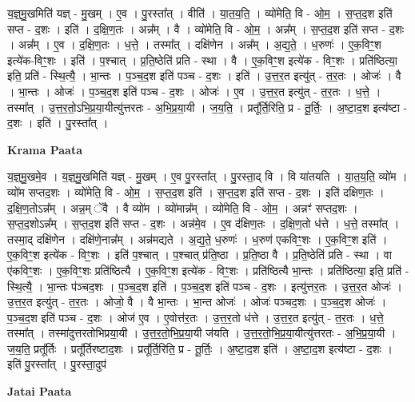 \documentclass[17pt]{extarticle}
\begin{document}
य॒ज्ञ्॒मु॒खमिति॑ यज्ञ् - मु॒खम् । ए॒व । पु॒रस्ता᳚त् । वीति॑ । या॒त॒य॒ति॒ । व्यो॑मेति॒ वि - ओ॒म॒ । स॒प्त॒द॒श इति॑ सप्त - द॒शः । इति॑ । द॒क्षि॒ण॒तः । अन्न᳚म् । वै । व्यो॑मेति॒ वि - ओ॒म॒ । अन्न᳚म् । स॒प्त॒द॒श इति॑ सप्त - द॒शः । अन्न᳚म् । ए॒व । द॒क्षि॒ण॒तः । ध॒त्ते॒ । तस्मा᳚त् । दक्षि॑णेन । अन्न᳚म् । अ॒द्य॒ते॒ । ध॒रुणः॑ । ए॒क॒विꣳ॒॒श इत्ये॑क-विꣳ॒॒शः । इति॑ । प॒श्चात् । प्र॒ति॒ष्ठेति॑ प्रति - स्था । वै । ए॒क॒विꣳ॒॒श इत्ये॑क - विꣳ॒॒शः । प्रति॑ष्ठित्या॒ इति॒ प्रति॑ - स्थि॒त्यै॒ । भा॒न्तः । प॒ञ्च॒द॒श इति॑ पञ्च - द॒शः । इति॑ । उ॒त्त॒र॒त इत्यु॑त् - त॒र॒तः । ओजः॑ । वै । भा॒न्तः । ओजः॑ । प॒ञ्च॒द॒श इति॑ पञ्च - द॒शः । ओजः॑ । ए॒व । उ॒त्त॒र॒त इत्यु॑त् - त॒र॒तः । ध॒त्ते॒ । तस्मा᳚त् । उ॒त्त॒र॒तो॒ऽभि॒प्र॒या॒यीत्यु॑त्तरतः - अ॒भि॒प्र॒या॒यी । ज॒य॒ति॒ । प्रतू᳚र्ति॒रिति॒ प्र - तू॒र्तिः॒ । अ॒ष्टा॒द॒श इत्य॑ष्टा - द॒शः । इति॑ । पु॒रस्ता᳚त् ।  \newline


\textbf{Krama Paata} \newline

य॒ज्ञ्॒मु॒खमे॒व । य॒ज्ञ्॒मु॒खमिति॑ यज्ञ् - मु॒खम् । ए॒व पु॒रस्ता᳚त् । पु॒रस्ता॒द् वि । वि या॑तयति । या॒त॒य॒ति॒ व्यो॑म । व्यो॑म सप्तद॒शः । व्यो॑मेति॒ वि - ओ॒म॒ । स॒प्त॒द॒श इति॑ । स॒प्त॒द॒श इति॑ सप्त - द॒शः । इति॑ दक्षिण॒तः । द॒क्षि॒ण॒तोऽन्न᳚म् । अन्न॒म् ॅवै । वै व्यो॑म । व्यो॑मान्न᳚म् । व्यो॑मेति॒ वि - ओ॒म॒ । अन्नꣳ॑ सप्तद॒शः । स॒प्त॒द॒शोऽन्न᳚म् । स॒प्त॒द॒श इति॑ सप्त - द॒शः । अन्न॑मे॒व । ए॒व द॑क्षिण॒तः । द॒क्षि॒ण॒तो ध॑त्ते । ध॒त्ते॒ तस्मा᳚त् । तस्मा॒द् दक्षि॑णेन । दक्षि॑णे॒नान्न᳚म् । अन्न॑मद्यते । अ॒द्य॒ते॒ ध॒रुणः॑ । ध॒रुण॑ एकविꣳ॒॒शः । ए॒क॒विꣳ॒॒श इति॑ । ए॒क॒विꣳ॒॒श इत्ये॑क - विꣳ॒॒शः । इति॑ प॒श्चात् । प॒श्चात् प्र॑ति॒ष्ठा । प्र॒ति॒ष्ठा वै । प्र॒ति॒ष्ठेति॑ प्रति - स्था । वा ए॑कविꣳ॒॒शः । ए॒क॒विꣳ॒॒शः प्रति॑ष्ठित्यै । ए॒क॒विꣳ॒॒श इत्ये॑क - विꣳ॒॒शः । प्रति॑ष्ठित्यै भा॒न्तः । प्रति॑ष्ठित्या॒ इति॒ प्रति॑ - स्थि॒त्यै॒ । भा॒न्तः प॑ञ्चद॒शः । प॒ञ्च॒द॒श इति॑ । प॒ञ्च॒द॒श इति॑ पञ्च - द॒शः । इत्यु॑त्तर॒तः । उ॒त्त॒र॒त ओजः॑ । उ॒त्त॒र॒त इत्यु॑त् - त॒र॒तः । ओजो॒ वै । वै भा॒न्तः । भा॒न्त ओजः॑ । ओजः॑ पञ्चद॒शः । प॒ञ्च॒द॒श ओजः॑ । प॒ञ्च॒द॒श इति॑ पञ्च - द॒शः । ओज॑ ए॒व । ए॒वोत्त॑र॒तः । उ॒त्त॒र॒तो ध॑त्ते । उ॒त्त॒र॒त इत्यु॑त् - त॒र॒तः । ध॒त्ते॒ तस्मा᳚त् । तस्मा॑दुत्तरतोभिप्रया॒यी । उ॒त्त॒र॒तो॒भि॒प्र॒या॒यी ज॑यति । उ॒त्त॒र॒तो॒भि॒प्र॒या॒यीत्यु॑त्तरतः - अ॒भि॒प्र॒या॒यी । ज॒य॒ति॒ प्रतू᳚र्तिः । प्रतू᳚र्तिरष्टाद॒शः । प्रतू᳚र्ति॒रिति॒ प्र - तू॒र्तिः॒ । अ॒ष्टा॒द॒श इति॑ । अ॒ष्टा॒द॒श इत्य॑ष्टा - द॒शः । इति॑ पु॒रस्ता᳚त् । पु॒रस्ता॒दुप॑ \newline

\textbf{Jatai Paata} \newline
\end{document}
